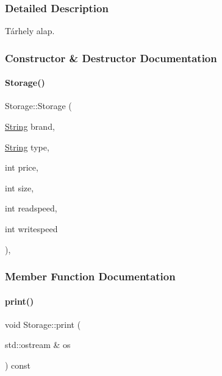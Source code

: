 \subsubsection{Detailed Description}
Tárhely alap. 

\subsubsection{Constructor \& Destructor Documentation}
\mbox{\label{class_storage_a502a2ec76e09d48a87da6ed1b91cdaa8}} 
\paragraph{\texorpdfstring{Storage()}{Storage()}}
{\footnotesize\ttfamily Storage\+::\+Storage (\begin{DoxyParamCaption}\item[{\mbox{\hyperlink{class_string}{String}}}]{brand,  }\item[{\mbox{\hyperlink{class_string}{String}}}]{type,  }\item[{int}]{price,  }\item[{int}]{size,  }\item[{int}]{readspeed,  }\item[{int}]{writespeed }\end{DoxyParamCaption})\hspace{0.3cm}{\ttfamily [inline]}, {\ttfamily [explicit]}}



\subsubsection{Member Function Documentation}
\mbox{\label{class_storage_aa9f6ffb0fd45839b54bd4e254270445d}} 
\paragraph{\texorpdfstring{print()}{print()}\hspace{0.1cm}{\footnotesize\ttfamily [1/4]}}
{\footnotesize\ttfamily void Storage\+::print (\begin{DoxyParamCaption}\item[{std\+::ostream \&}]{os }\end{DoxyParamCaption}) const\hspace{0.3cm}{\ttfamily [virtual]}}



